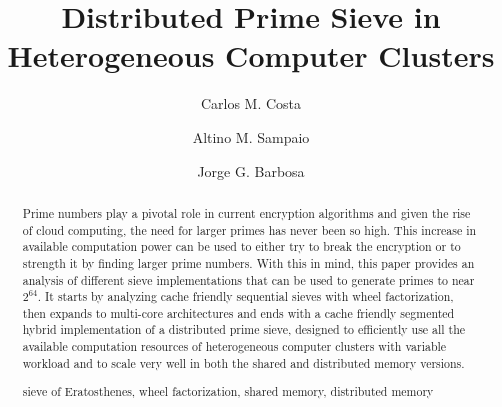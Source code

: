 \documentclass[runningheads,a4paper]{llncs}
\newcommand{\keywords}[1]{\par\addvspace\baselineskip
\noindent\keywordname\enspace\ignorespaces#1}
\begin{document}
\mainmatter  %

\title{Distributed Prime Sieve in Heterogeneous Computer Clusters}


%
%
\author{Carlos M. Costa \and Altino M. Sampaio \and Jorge G. Barbosa}
%


%
%

\maketitle


\begin{abstract}
Prime numbers play a pivotal role in current encryption algorithms and given the rise of cloud computing, the need for larger primes has never been so high. This increase in available computation power can be used to either try to break the encryption or to strength it by finding larger prime numbers. With this in mind, this paper provides an analysis of different sieve implementations that can be used to generate primes to near $2^{64}$. It starts by analyzing cache friendly sequential sieves with wheel factorization, then expands to multi-core architectures and ends with a cache friendly segmented hybrid implementation of a distributed prime sieve, designed to efficiently use all the available computation resources of heterogeneous computer clusters with variable workload and to scale very well in both the shared and distributed memory versions.

\keywords{sieve of Eratosthenes, wheel factorization, shared memory, distributed memory}
\end{abstract}
\end{document}
